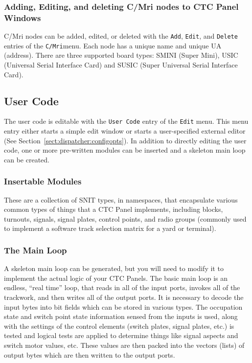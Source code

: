 \subsubsection{Adding, Editing, and deleting C/Mri nodes to CTC Panel
Windows}

C/Mri nodes can be added, edited, or deleted with the \verb=Add=,
\verb=Edit=, and \verb=Delete= entries of the \verb=C/Mri=menu. Each
node has a unique name and unique UA (address).  There are three
supported board types: SMINI (Super Mini), USIC (Universal Serial
Interface Card) and SUSIC (Super Universal Serial Interface Card).

\subsection{User Code}

The user code is editable with the \verb=User Code= entry of the
\verb=Edit= menu.  This menu entry either starts a simple edit window or
starts a user-specified external editor (See
Section~\ref{sect:dispatcher:configopts}).  In addition to directly
editing the user code, one or more pre-written modules can be inserted
and a skeleton main loop can be created.

\subsubsection{Insertable Modules}

These are a collection of SNIT types, in namespaces, that encapsulate
various common types of things that a CTC Panel implements, including
blocks, turnouts, signals, signal plates, control points, and radio
groups (commonly used to implement a software track selection matrix for
a yard or terminal).

\subsubsection{The Main Loop}

A skeleton main loop can be generated, but you will need to modify it to
implement the actual logic of your CTC Panels.  The basic main loop is an
endless, ``real time'' loop, that reads in all of the input ports,
invokes all of the trackwork, and then writes all of the output ports. 
It is necessary to decode the input bytes into bit fields which can be
stored in various types.  The occupation state and switch point state
information sensed from the inputs is used, along with the settings of
the control elements (switch plates, signal plates, etc.) is tested and
logical tests are applied to determine things like signal aspects and
switch motor values, etc. These values are then packed into the vectors
(lists) of output bytes which are then written to the output ports.

